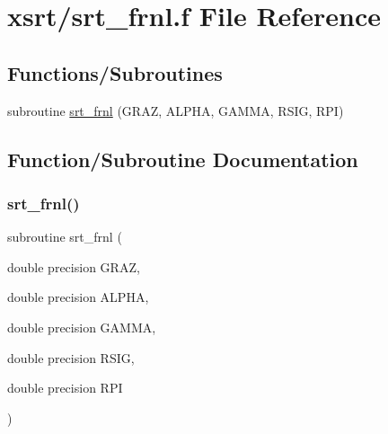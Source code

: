 \hypertarget{xsrt_2srt__frnl_8f}{}\section{xsrt/srt\+\_\+frnl.f File Reference}
\label{xsrt_2srt__frnl_8f}
\subsection*{Functions/\+Subroutines}
\begin{DoxyCompactItemize}
\item 
subroutine \hyperlink{xsrt_2srt__frnl_8f_acf68a0af600d5c36ae278932e61da241}{srt\+\_\+frnl} (G\+R\+AZ, A\+L\+P\+HA, G\+A\+M\+MA, R\+S\+IG, R\+PI)
\end{DoxyCompactItemize}


\subsection{Function/\+Subroutine Documentation}
\mbox{\label{xsrt_2srt__frnl_8f_acf68a0af600d5c36ae278932e61da241}} 
\subsubsection{\texorpdfstring{srt\+\_\+frnl()}{srt\_frnl()}}
{\footnotesize\ttfamily subroutine srt\+\_\+frnl (\begin{DoxyParamCaption}\item[{double precision}]{G\+R\+AZ,  }\item[{double precision}]{A\+L\+P\+HA,  }\item[{double precision}]{G\+A\+M\+MA,  }\item[{double precision}]{R\+S\+IG,  }\item[{double precision}]{R\+PI }\end{DoxyParamCaption})}

